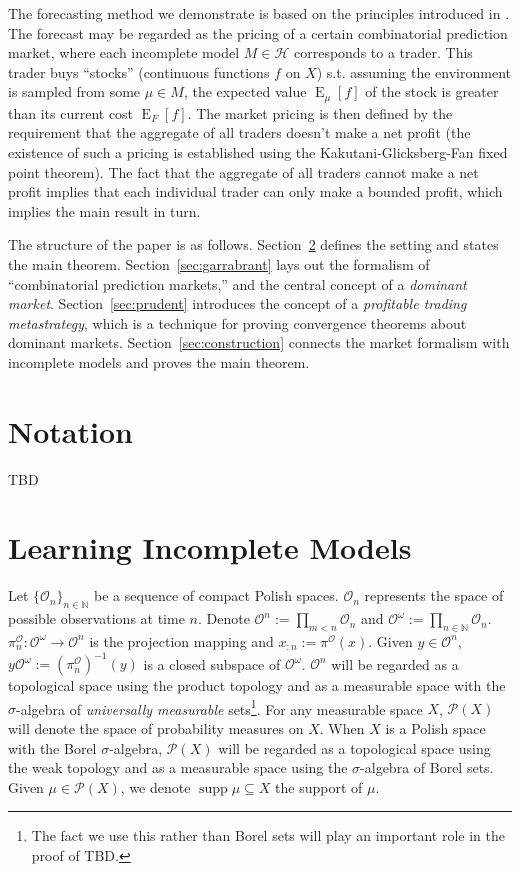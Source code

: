 \documentclass[11pt]{article}
\theoremstyle{definition}
\theoremstyle{plain}
\newcommand{\Nats}{\mathbb{N}}
\newcommand{\Sq}[2]{\{#1\}_{#2 \in \Nats}}
\newcommand{\Sqn}[1]{\Sq{#1}{n}}
\DeclareMathOperator{\E}{E}
\newcommand{\PM}{\mathcal{P}}
\DeclareMathOperator{\Sp}{supp}
\newcommand{\Ob}{\mathcal{O}}
\newcommand{\OO}{\Ob^\omega}
\newcommand{\PO}{\pi^\Ob}
\newcommand{\MC}{\mathcal{H}}
\begin{document}
The forecasting method we demonstrate is based on the principles introduced in \cite{Garrabrant_2016}. The forecast may be regarded as the pricing of a certain combinatorial prediction market, where each incomplete model $M \in \MC$ corresponds to a trader. This trader buys \enquote{stocks} (continuous functions $f$ on $X$) s.t. assuming the environment is sampled from some $\mu \in M$, the expected value $\E_\mu[f]$ of the stock is greater than its current cost $\E_{F}[f]$. The market pricing is then defined by the requirement that the aggregate of all traders doesn't make a net profit (the existence of such a pricing is established using the Kakutani-Glicksberg-Fan fixed point theorem). The fact that the aggregate of all traders cannot make a net profit implies that each individual trader can only make a bounded profit, which implies the main result in turn.

The structure of the paper is as follows. Section~\ref{sec:learning} defines the setting and states the main theorem. Section~\ref{sec:garrabrant} lays out the formalism of \enquote{combinatorial prediction markets,} and the central concept of a \emph{dominant market}. Section~\ref{sec:prudent} introduces the concept of a \emph{profitable trading metastrategy}, which is a technique for proving convergence theorems about dominant markets. Section~\ref{sec:construction} connects the market formalism with incomplete models and proves the main theorem.

\section{Notation}
\label{sec:notation}

TBD

\section{Learning Incomplete Models}
\label{sec:learning}

Let $\Sqn{\Ob_n}$ be a sequence of compact Polish spaces. $\Ob_n$ represents the space of possible observations at time $n$. Denote $\Ob^n := \prod_{m < n} \Ob_n$  and $\Ob^\omega:=\prod_{n \in \Nats} \Ob_n$. $\PO_n: \Ob^\omega \rightarrow \Ob^n$ is the projection mapping and $x_{:n}:=\PO(x)$. Given $y \in \Ob^n$, $y\OO := (\PO_n)^{-1}(y)$ is a closed subspace of $\OO$. $\Ob^n$ will be regarded as a topological space using the product topology and as a measurable space with the $\sigma$-algebra of \emph{universally measurable} sets\footnote{The fact we use this rather than Borel sets will play an important role in the proof of TBD.}. For any measurable space $X$, $\PM(X)$ will denote the space of probability measures on $X$. When $X$ is a Polish space with the Borel $\sigma$-algebra, $\PM(X)$ will be regarded as a topological space using the weak topology and as a measurable space using the $\sigma$-algebra of Borel sets. Given $\mu \in \PM(X)$, we denote $\Sp \mu \subseteq X$ the support of $\mu$.
\end{document}
